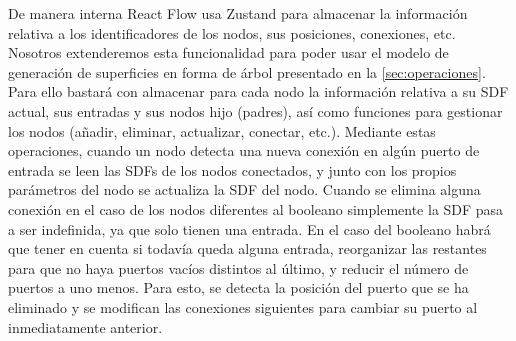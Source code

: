 De manera interna React Flow usa Zustand para almacenar la información relativa a los identificadores de los nodos, sus posiciones, conexiones, etc. Nosotros extenderemos esta funcionalidad para poder usar el modelo de generación de superficies en forma de árbol presentado en la \autoref{sec:operaciones}. Para ello bastará con almacenar para cada nodo la información relativa a su SDF actual, sus entradas y sus nodos hijo (padres), así como funciones para gestionar los nodos (añadir, eliminar, actualizar, conectar, etc.). Mediante estas operaciones, cuando un nodo detecta una nueva conexión en algún puerto de entrada se leen las SDFs de los nodos conectados, y junto con los propios parámetros del nodo se actualiza la SDF del nodo. Cuando se elimina alguna conexión en el caso de los nodos diferentes al booleano simplemente la SDF pasa a ser indefinida, ya que solo tienen una entrada. En el caso del booleano habrá que tener en cuenta si todavía queda alguna entrada, reorganizar las restantes para que no haya puertos vacíos distintos al último, y reducir el número de puertos a uno menos. Para esto, se detecta la posición del puerto que se ha eliminado y se modifican las conexiones siguientes para cambiar su puerto al inmediatamente anterior. 
